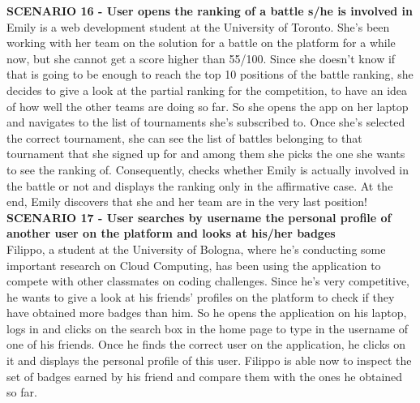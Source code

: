     \textbf{SCENARIO 16 - User opens the ranking of a battle s/he is involved in}\\
     Emily is a web development student at the University of Toronto. She's been working with her team on the solution for a battle on the \app platform for a while now, but she cannot get a score higher than 55/100. Since she doesn't know if that is going to be enough to reach the top 10 positions of the battle ranking, she decides to give a look at the partial ranking for the competition, to have an idea of how well the other teams are doing so far. So she opens the \app app on her laptop and navigates to the list of tournaments she's subscribed to. Once she's selected the correct tournament, she can see the list of battles belonging to that tournament that she signed up for and among them she picks the one she wants to see the ranking of. Consequently, \app checks whether Emily is actually involved in the battle or not and displays the ranking only in the affirmative case. 
     At the end, Emily discovers that she and her team are in the very last position!\\

    \textbf{SCENARIO 17 - User searches by username the personal profile of another user on the platform and looks at his/her badges}\\
    Filippo, a student at the University of Bologna, where he's conducting some important research on Cloud Computing, has been using the \app application to compete with other classmates on coding challenges. Since he's very competitive, he wants to give a look at his friends' profiles on the platform to check if they have obtained more badges than him. So he opens the \app application on his laptop, logs in and clicks on the search box in the home page to type in the username of one of his friends. Once he finds the correct user on the application, he clicks on it and \app displays the personal profile of this user. Filippo is able now to inspect the set of badges earned by his friend and compare them with the ones he obtained so far.\\